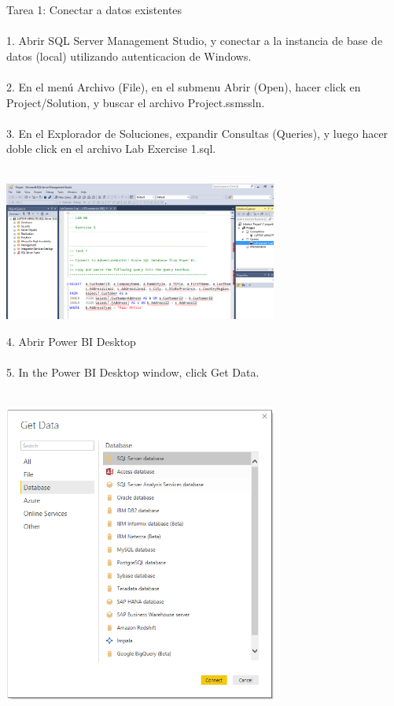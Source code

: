 \documentclass[12pt,letterpaper]{article}
\begin{document}
Tarea 1: Conectar a datos existentes\\\\ 
1. Abrir SQL Server Management Studio, y conectar a la instancia de base de datos (local) utilizando
autenticacion de Windows.\\\\ 
2. En el menú Archivo (File), en el submenu Abrir (Open), hacer click en Project/Solution, y buscar el archivo
Project.ssmssln.\\\\ 
3. En el Explorador de Soluciones, expandir Consultas (Queries), y luego hacer doble click en el archivo Lab
Exercise 1.sql.\\\\ 
\begin{center}
\includegraphics[width=9cm]{IMG/3.png} 
\end{center}
4. Abrir Power BI Desktop\\\\ 
5. In the Power BI Desktop window, click Get Data.\\\\
\begin{center}
\includegraphics[width=9cm]{IMG/31.png} 
\end{center}
\end{document}
